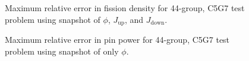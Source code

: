 \documentclass[5p,times,twocolumn,10pt]{elsarticle}
\begin{document}
\begin{figure}[htb]
\caption{Maximum relative error in fission density for 44-group, C5G7 test problem using snapshot of $\phi$, $J_{\text{up}}$, and $J_{\text{down}}$.}
\label{fig:c5g7-combined}
\end{figure}

\begin{figure}[htb]
\caption{Maximum relative error in pin power for 44-group, C5G7 test problem using snapshot of only $\phi$.}
\label{fig:c5g7-flux-only-pp}
\end{figure}
\end{document}
